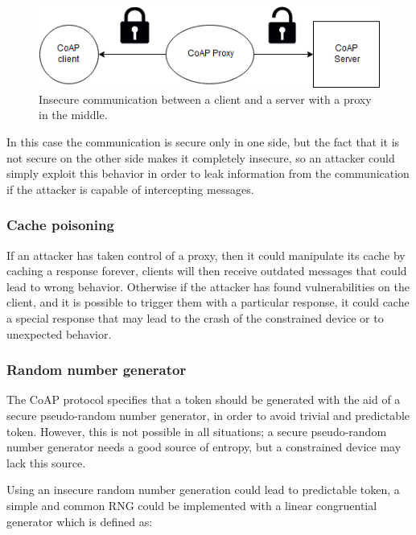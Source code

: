	\begin{figure}
		\includegraphics[width=\linewidth]{coap-vuln-img4.png}
		\caption{Insecure communication between a client and a server with a proxy in the middle.}
		\label{fig:coap-vuln4}
	\end{figure}
	
	In this case the communication is secure only in one side, but the fact that it is not secure on the other side makes it completely insecure, so an attacker could simply exploit this behavior in order to leak information from the communication if the attacker is capable of intercepting messages.\newline
	
	\subsubsection{Cache poisoning}
	If an attacker has taken control of a proxy, then it could manipulate its cache by caching a response forever, clients will then receive outdated messages that could lead to wrong behavior.\newline
	Otherwise if the attacker has found vulnerabilities on the client, and it is possible to trigger them with a particular response, it could cache a special response that may lead to the crash of the constrained device or to unexpected behavior.
	
	\subsubsection{Random number generator}
	The CoAP protocol specifies that a token should be generated with the aid of a secure pseudo-random number generator, in order to avoid trivial and predictable token.\newline
	However, this is not possible in all situations; a secure pseudo-random number generator needs a good source of entropy, but a constrained device may lack this source.\newline
	
	Using an insecure random number generation could lead to predictable token, a simple and common RNG could be implemented with a linear congruential generator which is defined as:
	
